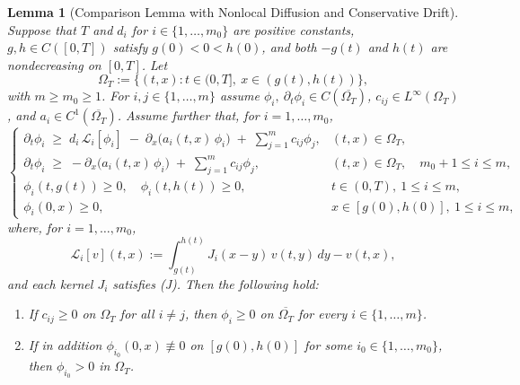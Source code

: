 \documentclass[a4paper,11pt]{amsart}
\newtheorem{lemma}[theorem]{Lemma}
\theoremstyle{definition}
\numberwithin{equation}{section}
\theoremstyle{definition}
\begin{document}
\begin{lemma}[Comparison Lemma with Nonlocal Diffusion and Conservative Drift]
Suppose that $T$ and $d_i$ for $i\in\{1,\ldots,m_0\}$ are positive constants,
$g,h\in C([0,T])$ satisfy $g(0)<0<h(0)$, and both $-g(t)$ and $h(t)$ are nondecreasing on $[0,T]$.
Let
\[
\Omega_T:=\{(t,x): t\in(0,T],\ x\in(g(t),h(t))\},
\]
with $m\ge m_0\ge 1$. For $i,j\in\{1,\ldots,m\}$ assume
$\phi_i,\ \partial_t\phi_i\in C(\overline{\Omega_T})$, $c_{ij}\in L^\infty(\Omega_T)$,
and $a_i\in C^1(\overline{\Omega_T})$. Assume further that, for $i=1,\dots,m_0$,
\[
\begin{cases}
\partial_t\phi_i \;\geq\; d_i\,\mathcal{L}_i[\phi_i]\;-\;\partial_x\big(a_i(t,x)\,\phi_i\big)
\;+\;\displaystyle\sum_{j=1}^m c_{ij}\phi_j,
& (t,x)\in\Omega_T,\\[1ex]
\partial_t\phi_i \;\ge\; -\partial_x\big(a_i(t,x)\,\phi_i\big)
\;+\;\displaystyle\sum_{j=1}^m c_{ij}\phi_j,
& (t,x)\in\Omega_T,\quad m_0+1\le i\leq m,\\[1ex]
\phi_i(t,g(t))\geq 0,\quad \phi_i(t,h(t))\geq 0, & t\in(0,T),\ 1\leq i\le m,\\[0.5ex]
\phi_i(0,x)\geq 0, & x\in[g(0),h(0)],\ 1\leq i\leq m,
\end{cases}
\]
where, for $i=1,\dots,m_0$,
\[
\mathcal{L}_i[v](t,x):=\int_{g(t)}^{h(t)} J_i(x-y)\,v(t,y)\,dy - v(t,x),
\]
and each kernel $J_i$ satisfies (J). Then the following hold:
\begin{enumerate}
  \item If $c_{ij}\geq 0$ on $\Omega_T$ for all $i\neq j$, then $\phi_i\geq 0$ on $\overline{\Omega_T}$ for every $i\in\{1,\ldots,m\}$.
  \item If in addition $\phi_{i_0}(0,x)\not\equiv 0$ on $[g(0),h(0)]$ for some $i_0\in\{1,\ldots,m_0\}$, then $\phi_{i_0}>0$ in $\Omega_T$.
\end{enumerate}
\end{lemma}
\end{document}
